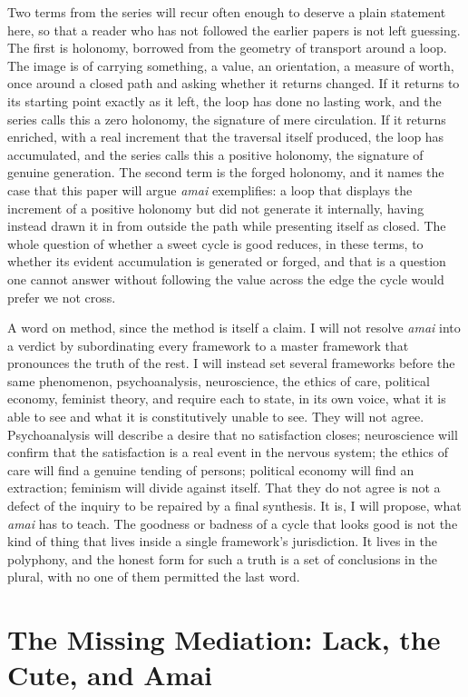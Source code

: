 Two terms from the series will recur often enough to deserve a plain statement here, so that a reader who has not followed the earlier papers is not left guessing. The first is holonomy, borrowed from the geometry of transport around a loop. The image is of carrying something, a value, an orientation, a measure of worth, once around a closed path and asking whether it returns changed. If it returns to its starting point exactly as it left, the loop has done no lasting work, and the series calls this a zero holonomy, the signature of mere circulation. If it returns enriched, with a real increment that the traversal itself produced, the loop has accumulated, and the series calls this a positive holonomy, the signature of genuine generation. The second term is the forged holonomy, and it names the case that this paper will argue \textit{amai} exemplifies: a loop that displays the increment of a positive holonomy but did not generate it internally, having instead drawn it in from outside the path while presenting itself as closed. The whole question of whether a sweet cycle is good reduces, in these terms, to whether its evident accumulation is generated or forged, and that is a question one cannot answer without following the value across the edge the cycle would prefer we not cross.

A word on method, since the method is itself a claim. I will not resolve \textit{amai} into a verdict by subordinating every framework to a master framework that pronounces the truth of the rest. I will instead set several frameworks before the same phenomenon, psychoanalysis, neuroscience, the ethics of care, political economy, feminist theory, and require each to state, in its own voice, what it is able to see and what it is constitutively unable to see. They will not agree. Psychoanalysis will describe a desire that no satisfaction closes; neuroscience will confirm that the satisfaction is a real event in the nervous system; the ethics of care will find a genuine tending of persons; political economy will find an extraction; feminism will divide against itself. That they do not agree is not a defect of the inquiry to be repaired by a final synthesis. It is, I will propose, what \textit{amai} has to teach. The goodness or badness of a cycle that looks good is not the kind of thing that lives inside a single framework's jurisdiction. It lives in the polyphony, and the honest form for such a truth is a set of conclusions in the plural, with no one of them permitted the last word.

\section{The Missing Mediation: Lack, the Cute, and Amai}

